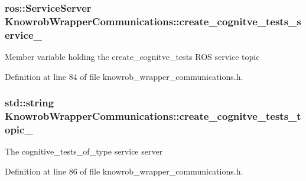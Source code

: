 \hypertarget{classKnowrobWrapperCommunications_a835254476d15a2c224069d4ff5ae0ce5}{
\subsubsection[{create\-\_\-cognitve\-\_\-tests\-\_\-service\-\_\-}]{\setlength{\rightskip}{0pt plus 5cm}ros\-::\-Service\-Server Knowrob\-Wrapper\-Communications\-::create\-\_\-cognitve\-\_\-tests\-\_\-service\-\_\-\hspace{0.3cm}{\ttfamily [private]}}}\label{classKnowrobWrapperCommunications_a835254476d15a2c224069d4ff5ae0ce5}
Member variable holding the create\-\_\-cognitve\-\_\-tests R\-O\-S service topic 

Definition at line 84 of file knowrob\-\_\-wrapper\-\_\-communications.\-h.

\hypertarget{classKnowrobWrapperCommunications_ab90753196ac931da226e940346162255}{
\subsubsection[{create\-\_\-cognitve\-\_\-tests\-\_\-topic\-\_\-}]{\setlength{\rightskip}{0pt plus 5cm}std\-::string Knowrob\-Wrapper\-Communications\-::create\-\_\-cognitve\-\_\-tests\-\_\-topic\-\_\-\hspace{0.3cm}{\ttfamily [private]}}}\label{classKnowrobWrapperCommunications_ab90753196ac931da226e940346162255}
The cognitive\-\_\-tests\-\_\-of\-\_\-type service server 

Definition at line 86 of file knowrob\-\_\-wrapper\-\_\-communications.\-h.

